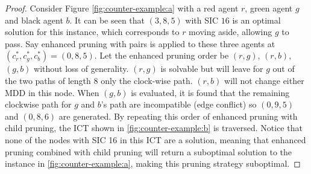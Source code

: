 \documentclass[english]{article}
\begin{document}
	\begin{proof}
		Consider Figure \ref{fig:counter-example:a} with a red agent $r$, green agent $g$ and black agent $b$. It can be seen that $(3,8,5)$ with SIC $16$ is an optimal solution for this instance, which corresponds to $r$ moving aside, allowing $g$ to pass.  Say enhanced pruning with pairs is applied to these three agents at $(c^*_r,c^*_g,c^*_b) = (0,8,5)$. Let the enhanced pruning order be $(r,g)$, $(r,b)$, $(g,b)$ without loss of generality. $(r,g)$ is solvable but will leave for $g$ out of the two paths of length $8$ only the clock-wise path. $(r,b)$ will not change either MDD in this node. When $(g,b)$ is evaluated, it is found that the remaining clockwise path for $g$ and $b$'s path are incompatible (edge conflict) so $(0,9,5)$ and $(0,8,6)$ are generated. By repeating this order of enhanced pruning with child pruning, the ICT shown in \ref{fig:counter-example:b} is traversed. Notice that none of the nodes with SIC 16 in this ICT are a solution, meaning that enhanced pruning combined with child pruning will return a suboptimal solution to the instance in \ref{fig:counter-example:a}, making this pruning strategy suboptimal.
	\end{proof}
	
\end{document}
